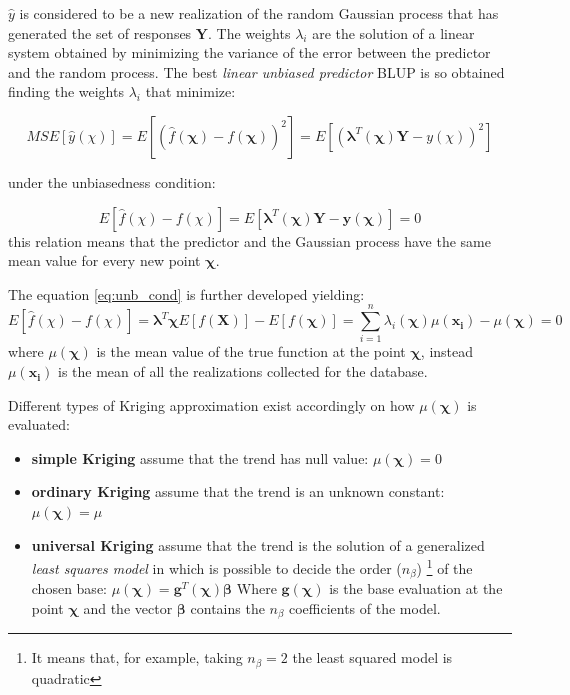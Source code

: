 $\hat{y}$ is considered to be a new realization of the random Gaussian process that has generated the set of responses $\mathbf{Y}$.
The weights $\lambda_i$ are the solution of a linear system obtained by minimizing the variance of the error between the predictor and the random process.
The best \textit{linear unbiased predictor} BLUP is so obtained finding the weights $\lambda_i$ that minimize:

\begin{equation}
MSE[\hat{y}(\chi)] =  E \left[\left( \hat{f}(\boldsymbol{\chi})  -f(\boldsymbol{\chi}) \right)^2\right] = E \left[\left(   \boldsymbol{\lambda}^T(\boldsymbol{\chi})\mathbf{Y} -y(\chi)\right)^2\right]
\label{eq:var_err}
\end{equation}

under the unbiasedness condition:

\begin{equation}
E \left[ \hat{f}(\chi)  -f(\chi)\right] =  E \left[ \boldsymbol{\lambda}^T(\boldsymbol{\chi})\mathbf{Y} -\mathbf{y}(\boldsymbol{\chi})  \right] = 0
\label{eq:unb_cond}
\end{equation}
this relation means that the predictor and the Gaussian process have the same mean value for every new point $\boldsymbol{\chi}$.

The equation \eqref{eq:unb_cond} is further developed yielding:
\begin{equation}
E \left[ \hat{f}(\chi)  -f(\chi)\right] = \boldsymbol{\lambda}^T \boldsymbol{\chi} E \left[ f(\mathbf{X})  \right] - E \left[ f(\boldsymbol{\chi})  \right] = \sum_{i=1}^{n} \lambda_i(\boldsymbol{\chi}) \mu(\mathbf{x_i}) - \mu(\boldsymbol{\chi}) = 0
\label{eq:unb_cond2}
\end{equation}
where $\mu(\boldsymbol{\chi})$ is the mean value of the true function at the point $\boldsymbol{\chi}$, instead $\mu(\mathbf{x_i})$ is the mean of all the realizations collected for the database.

Different types of Kriging approximation exist accordingly on how $\mu(\boldsymbol{\chi})$ is evaluated:
\begin{itemize}
	\item \textbf{simple Kriging} assume that the trend has null value: $\mu(\boldsymbol{\chi}) = 0$
	\item \textbf{ordinary Kriging} assume that the trend is an unknown constant: $\mu(\boldsymbol{\chi}) = \mu$
	\item \textbf{universal Kriging} assume that the trend is the solution of a generalized \textit{least squares model} in which is possible to decide the order ($n_{\beta}$) \footnote{It means that, for example, taking $n_{\beta}= 2$ the least squared model is quadratic} of the chosen base: $\mu(\boldsymbol{\chi}) = \mathbf{g}^T(\boldsymbol{\chi}) \boldsymbol{\beta}$
	Where $\mathbf{g}(\boldsymbol{\chi})$ is the base evaluation at the point $\boldsymbol{\chi}$ and the vector $\boldsymbol{\beta}$ contains the $n_{\beta}$ coefficients of the model.
\end{itemize}

